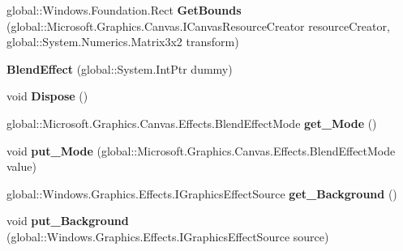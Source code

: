\begin{DoxyCompactItemize}
\mbox{\label{class_microsoft_1_1_graphics_1_1_canvas_1_1_effects_1_1_blend_effect_aeaac7a44c02206f0c747d639ddf8c73a}} 
global\+::\+Windows.\+Foundation.\+Rect {\bfseries Get\+Bounds} (global\+::\+Microsoft.\+Graphics.\+Canvas.\+I\+Canvas\+Resource\+Creator resource\+Creator, global\+::\+System.\+Numerics.\+Matrix3x2 transform)
\item 
\mbox{\label{class_microsoft_1_1_graphics_1_1_canvas_1_1_effects_1_1_blend_effect_aacace451098126cd26608dce234e9905}} 
{\bfseries Blend\+Effect} (global\+::\+System.\+Int\+Ptr dummy)
\item 
\mbox{\label{class_microsoft_1_1_graphics_1_1_canvas_1_1_effects_1_1_blend_effect_a5d0e95366e1252da3cf90f1d61cd0935}} 
void {\bfseries Dispose} ()
\item 
\mbox{\label{class_microsoft_1_1_graphics_1_1_canvas_1_1_effects_1_1_blend_effect_ab50bbe9eaad5189343a4e0dc8958294a}} 
global\+::\+Microsoft.\+Graphics.\+Canvas.\+Effects.\+Blend\+Effect\+Mode {\bfseries get\+\_\+\+Mode} ()
\item 
\mbox{\label{class_microsoft_1_1_graphics_1_1_canvas_1_1_effects_1_1_blend_effect_ae28d797f3ec0b639d357346a4e2eb258}} 
void {\bfseries put\+\_\+\+Mode} (global\+::\+Microsoft.\+Graphics.\+Canvas.\+Effects.\+Blend\+Effect\+Mode value)
\item 
\mbox{\label{class_microsoft_1_1_graphics_1_1_canvas_1_1_effects_1_1_blend_effect_a8c5401801aebc2069ae548d01680f8a9}} 
global\+::\+Windows.\+Graphics.\+Effects.\+I\+Graphics\+Effect\+Source {\bfseries get\+\_\+\+Background} ()
\item 
\mbox{\label{class_microsoft_1_1_graphics_1_1_canvas_1_1_effects_1_1_blend_effect_abd598b6c76aa0c92ce04d0ec53ec328e}} 
void {\bfseries put\+\_\+\+Background} (global\+::\+Windows.\+Graphics.\+Effects.\+I\+Graphics\+Effect\+Source source)

\end{DoxyCompactItemize}
